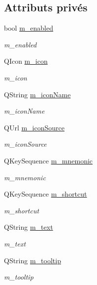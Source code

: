 \subsection*{Attributs privés}
\begin{DoxyCompactItemize}
\item 
bool \hyperlink{classSH__ExtendedQQmlAction_ad93920806001da9e32b7b2a3d3d9213e}{m\-\_\-enabled}
\begin{DoxyCompactList}\small\item\em m\-\_\-enabled \end{DoxyCompactList}\item 
Q\-Icon \hyperlink{classSH__ExtendedQQmlAction_a4386f56e28c2c70cfedd16c1d8c2c4a4}{m\-\_\-icon}
\begin{DoxyCompactList}\small\item\em m\-\_\-icon \end{DoxyCompactList}\item 
Q\-String \hyperlink{classSH__ExtendedQQmlAction_a3375d1504e5ec862ed05500bf529d95c}{m\-\_\-icon\-Name}
\begin{DoxyCompactList}\small\item\em m\-\_\-icon\-Name \end{DoxyCompactList}\item 
Q\-Url \hyperlink{classSH__ExtendedQQmlAction_a61c8633eab1fa3b69752074220e785fc}{m\-\_\-icon\-Source}
\begin{DoxyCompactList}\small\item\em m\-\_\-icon\-Source \end{DoxyCompactList}\item 
Q\-Key\-Sequence \hyperlink{classSH__ExtendedQQmlAction_a7c924c07aa50a7228b6e8f31c4520896}{m\-\_\-mnemonic}
\begin{DoxyCompactList}\small\item\em m\-\_\-mnemonic \end{DoxyCompactList}\item 
Q\-Key\-Sequence \hyperlink{classSH__ExtendedQQmlAction_ac84d3a2113efb715321b905580b08bc5}{m\-\_\-shortcut}
\begin{DoxyCompactList}\small\item\em m\-\_\-shortcut \end{DoxyCompactList}\item 
Q\-String \hyperlink{classSH__ExtendedQQmlAction_a8fd83c5e68691a582fa7e0c62d661c71}{m\-\_\-text}
\begin{DoxyCompactList}\small\item\em m\-\_\-text \end{DoxyCompactList}\item 
Q\-String \hyperlink{classSH__ExtendedQQmlAction_af04bb6a8446dcd4701a98fc667be693f}{m\-\_\-tooltip}
\begin{DoxyCompactList}\small\item\em m\-\_\-tooltip \end{DoxyCompactList}\end{DoxyCompactItemize}


